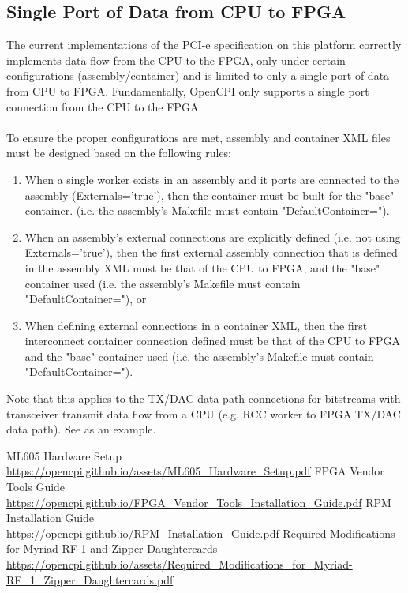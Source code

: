 \documentclass{article}
\begin{document}
\subsection{Single Port of Data from CPU to FPGA} %
\label{bug:3783}
The current implementations of the PCI-e specification on this platform correctly implements data flow from the CPU to the FPGA, only under certain configurations (assembly/container) and is limited to only a single port of data from CPU to FPGA. Fundamentally, OpenCPI only supports a single port connection from the CPU to the FPGA. \\ \\
To ensure the proper configurations are met, assembly and container XML files must be designed based on the following rules:
\begin{enumerate}
\item When a single worker exists in an assembly and it ports are connected to the assembly (Externals='true'), then
the container must be built for the "base" container. (i.e. the assembly's Makefile must contain "DefaultContainer=").
\item When an assembly's external connections are explicitly defined (i.e. not using Externals='true'), then the first external assembly connection that is defined in the assembly XML must be that of the CPU to FPGA, and the "base" container used (i.e. the assembly's Makefile must contain "DefaultContainer="), or
\item When defining external connections in a container XML, then the first interconnect container connection defined must be that of the CPU to FPGA and the "base" container used (i.e. the assembly's Makefile must contain "DefaultContainer=").
\end{enumerate}
Note that this applies to the TX/DAC data path connections for bitstreams with transceiver transmit data flow from a CPU (e.g. RCC worker to FPGA TX/DAC data path). See  as an example.

\pagebreak
  \begin{thebibliography}{1}


   ML605 Hardware Setup\\
	 \url{https://opencpi.github.io/assets/ML605_Hardware_Setup.pdf}
   FPGA Vendor Tools Guide\\
	 \url{https://opencpi.github.io/FPGA_Vendor_Tools_Installation_Guide.pdf}
	    RPM Installation Guide\\
	 \url{https://opencpi.github.io/RPM_Installation_Guide.pdf}
	    Required Modifications for Myriad-RF 1 and Zipper Daughtercards\\
	 \url{https://opencpi.github.io/assets/Required_Modifications_for_Myriad-RF_1_Zipper_Daughtercards.pdf}

  \end{thebibliography}
\end{document}
